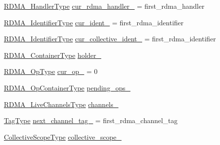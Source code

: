 \begin{DoxyCompactItemize}
\item 
\hyperlink{namespacevt_a9530efb893c0f3846e8ac5f0507e0f49}{R\+D\+M\+A\+\_\+\+Handler\+Type} \hyperlink{structvt_1_1rdma_1_1_r_d_m_a_manager_a4cd37fd70b9598a06a8edbadb44a9eb4}{cur\+\_\+rdma\+\_\+handler\+\_\+} = first\+\_\+rdma\+\_\+handler
\item 
\hyperlink{namespacevt_1_1rdma_a3b7f2eba1e9063a37d9301061c1432f1}{R\+D\+M\+A\+\_\+\+Identifier\+Type} \hyperlink{structvt_1_1rdma_1_1_r_d_m_a_manager_abcdb9005492e7a1145c9b8c9e9e271b0}{cur\+\_\+ident\+\_\+} = first\+\_\+rdma\+\_\+identifier
\item 
\hyperlink{namespacevt_1_1rdma_a3b7f2eba1e9063a37d9301061c1432f1}{R\+D\+M\+A\+\_\+\+Identifier\+Type} \hyperlink{structvt_1_1rdma_1_1_r_d_m_a_manager_a4369f821141f2e140441f1b590661a7b}{cur\+\_\+collective\+\_\+ident\+\_\+} = first\+\_\+rdma\+\_\+identifier
\item 
\hyperlink{structvt_1_1rdma_1_1_r_d_m_a_manager_a55dd81ff646ebb9d61ebf3a7239ec3b8}{R\+D\+M\+A\+\_\+\+Container\+Type} \hyperlink{structvt_1_1rdma_1_1_r_d_m_a_manager_ab5a0e70728339dd6955d355754f4892a}{holder\+\_\+}
\item 
\hyperlink{namespacevt_1_1rdma_a9b966d9780a2b41afe7cd7b7b4b20300}{R\+D\+M\+A\+\_\+\+Op\+Type} \hyperlink{structvt_1_1rdma_1_1_r_d_m_a_manager_a64c6d7af9b79b175cfbcfe86e40db23e}{cur\+\_\+op\+\_\+} = 0
\item 
\hyperlink{structvt_1_1rdma_1_1_r_d_m_a_manager_a8c9def755fab6d3eb1f529175243f38a}{R\+D\+M\+A\+\_\+\+Op\+Container\+Type} \hyperlink{structvt_1_1rdma_1_1_r_d_m_a_manager_aa4007bae161761451dc033f5555d0461}{pending\+\_\+ops\+\_\+}
\item 
\hyperlink{structvt_1_1rdma_1_1_r_d_m_a_manager_a689c48ff97319fd83c19e7230b8e9d62}{R\+D\+M\+A\+\_\+\+Live\+Channels\+Type} \hyperlink{structvt_1_1rdma_1_1_r_d_m_a_manager_aaedab94d025b3aa711c48e881d81d048}{channels\+\_\+}
\item 
\hyperlink{namespacevt_a84ab281dae04a52a4b243d6bf62d0e52}{Tag\+Type} \hyperlink{structvt_1_1rdma_1_1_r_d_m_a_manager_a583736edf4cc08a6072d5284df9e4560}{next\+\_\+channel\+\_\+tag\+\_\+} = first\+\_\+rdma\+\_\+channel\+\_\+tag
\item 
\hyperlink{structvt_1_1rdma_1_1_r_d_m_a_manager_ab2b109454390c41ea74e72a2850edd12}{Collective\+Scope\+Type} \hyperlink{structvt_1_1rdma_1_1_r_d_m_a_manager_ada74c89614007b46c007876825dd73a5}{collective\+\_\+scope\+\_\+}
\end{DoxyCompactItemize}
